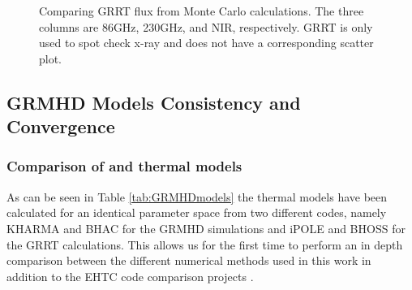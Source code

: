 
\begin{figure}
    \centering
    \caption{Comparing GRRT flux from Monte Carlo calculations.  The three columns are 86GHz, 230GHz, and NIR, respectively.  GRRT is only used to spot check x-ray and does not have a corresponding scatter plot.}
    \label{fig:sed_vv}
\end{figure}


\subsection{GRMHD Models Consistency and Convergence}\label{app:resolution_study}



\subsubsection{Comparison of \kharma and \bhac thermal models}

As can be seen in Table \ref{tab:GRMHDmodels} the thermal models have been calculated for an identical parameter space from two different codes, namely KHARMA and BHAC for the GRMHD simulations and iPOLE and BHOSS for the GRRT calculations. This allows us for the first time to perform an in depth comparison between the different numerical methods used in this work in addition to the EHTC code comparison projects \citep{2019ApJS..243...26P,2020ApJ...897..148G}.

